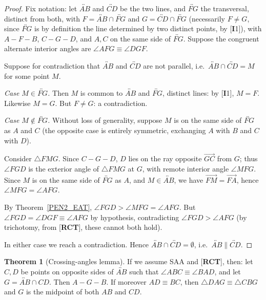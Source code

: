 \documentclass[11pt,a4paper]{article}
\theoremstyle{definition}
\newtheorem{thm}{Theorem}[section]
\theoremstyle{remark}
\numberwithin{equation}{section}
\begin{document}
\begin{proof}
Fix notation: let $\overleftrightarrow{AB}$ and $\overleftrightarrow{CD}$ be the two lines,
and $\overleftrightarrow{FG}$ the transversal, distinct from both, with
$F=\overleftrightarrow{AB}\cap\overleftrightarrow{FG}$ and
$G=\overleftrightarrow{CD}\cap\overleftrightarrow{FG}$ (necessarily $F\neq G$, since
$\overleftrightarrow{FG}$ is by definition the line determined by two distinct points, by
[\textbf{I}1]), with $A-F-B$, $C-G-D$, and $A,C$ on the same side of $\overleftrightarrow{FG}$.
Suppose the congruent alternate interior angles are $\angle AFG\equiv\angle DGF$.

Suppose for contradiction that $\overleftrightarrow{AB}$ and $\overleftrightarrow{CD}$ are
not parallel, i.e.\ $\overleftrightarrow{AB}\cap\overleftrightarrow{CD}=M$ for some point $M$.

\emph{Case $M\in\overleftrightarrow{FG}$.} Then $M$ is common to $\overleftrightarrow{AB}$
and $\overleftrightarrow{FG}$, distinct lines: by [\textbf{I}1], $M=F$. Likewise $M=G$. But
$F\neq G$: a contradiction.

\emph{Case $M\notin\overleftrightarrow{FG}$.} Without loss of generality, suppose $M$ is on
the same side of $\overleftrightarrow{FG}$ as $A$ and $C$ (the opposite case is entirely
symmetric, exchanging $A$ with $B$ and $C$ with $D$).

Consider $\triangle FMG$. Since $C-G-D$, $D$ lies on the ray opposite
$\overrightarrow{GC}$ from $G$; thus $\angle FGD$ is the exterior angle of $\triangle FMG$ at
$G$, with remote interior angle $\angle MFG$. Since $M$ is on the same side of
$\overleftrightarrow{FG}$ as $A$, and $M\in\overleftrightarrow{AB}$, we have
$\overrightarrow{FM}=\overrightarrow{FA}$, hence $\angle MFG=\angle AFG$.

By Theorem~\ref{PEN2_EAT}, $\angle FGD>\angle MFG=\angle AFG$. But
$\angle FGD=\angle DGF\equiv\angle AFG$ by hypothesis, contradicting
$\angle FGD>\angle AFG$ (by trichotomy, from [\textbf{RCT}], these cannot both hold).

In either case we reach a contradiction. Hence
$\overleftrightarrow{AB}\cap\overleftrightarrow{CD}=\emptyset$, i.e.\
$\overleftrightarrow{AB}\parallel\overleftrightarrow{CD}$.
\end{proof}

\begin{thm}[Crossing-angles lemma]\label{PEN2_CA}
If we assume SAA and [\textbf{RCT}], then: let $C,D$ be points on opposite sides of
$\overleftrightarrow{AB}$ such that $\angle ABC\equiv\angle BAD$, and let
$G=\overleftrightarrow{AB}\cap CD$. Then $A-G-B$. If moreover $AD\equiv BC$, then
$\triangle DAG\equiv\triangle CBG$ and $G$ is the midpoint of both $AB$ and $CD$.
\end{thm}
\end{document}
